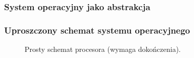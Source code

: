 \documentclass[10pt,t]{beamer}
\begin{document}
\begin{frame}
  \frametitle{System operacyjny jako abstrakcja}




\end{frame}





\begin{frame}
  \frametitle{Uproszczony schemat systemu operacyjnego}


  \begin{figure}

    \label{fig:Scheme-of-CPU}



    \caption{Prosty schemat procesora (wymaga dokończenia).}


  \end{figure}

\end{frame}
\end{document}
